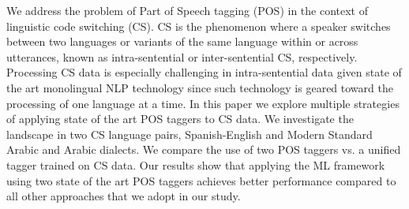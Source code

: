 We address the problem of Part of Speech tagging (POS) in the context of linguistic code switching (CS). CS is the phenomenon where a speaker switches between two languages or variants of the same language within or across utterances, known as intra-sentential or inter-sentential CS, respectively. Processing CS data is especially challenging in intra-sentential data given state of the art monolingual NLP technology since such technology is geared toward the processing of one language at a time. In this paper we explore multiple strategies of applying state of the art POS taggers to CS data. We investigate the landscape in two CS language pairs, Spanish-English and Modern Standard Arabic and Arabic dialects. We compare the use of two POS taggers vs. a unified tagger trained on CS data. Our results show that applying the ML framework using two state of the art POS taggers achieves better performance compared to all other approaches that we adopt in our study.

